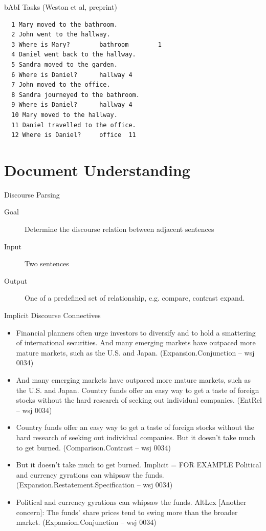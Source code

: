 \documentclass{beamer}
\begin{document}
\begin{frame}[fragile]{bAbI Tasks (Weston et al, preprint) }
\begin{verbatim}
  1 Mary moved to the bathroom.
  2 John went to the hallway.
  3 Where is Mary?        bathroom        1
  4 Daniel went back to the hallway.
  5 Sandra moved to the garden.
  6 Where is Daniel?      hallway 4
  7 John moved to the office.
  8 Sandra journeyed to the bathroom.
  9 Where is Daniel?      hallway 4
  10 Mary moved to the hallway.
  11 Daniel travelled to the office.
  12 Where is Daniel?     office  11
\end{verbatim}
\end{frame}

\section{Document Understanding}

\begin{frame}{Discourse Parsing}
  \begin{description}
  \item[Goal] Determine the discourse relation between adjacent sentences
  \item[Input] Two sentences 
  \item[Output] One of a predefined set of relationship, e.g. compare, contrast expand.
  \end{description}  

\end{frame}

\begin{frame}{Implicit Discourse Connectives}
  \begin{itemize}
  \item Financial planners often urge investors to diversify and to
    hold a smattering of international securities. And many emerging
    markets have outpaced more mature markets, such as the U.S. and
    Japan.  (Expansion.Conjunction – wsj 0034) 
  \item And many emerging
    markets have outpaced more mature markets, such as the U.S. and
    Japan. Country funds offer an easy way to get a taste of foreign
    stocks without the hard research of seeking out individual
    companies.  (EntRel – wsj 0034) 
  \item Country funds offer an easy
    way to get a taste of foreign stocks without the hard research of
    seeking out individual companies. But it doesn’t take much to get
    burned.  (Comparison.Contrast – wsj 0034) 
  \item But it doesn’t take
    much to get burned. Implicit = FOR EXAMPLE Political and currency
    gyrations can whipsaw the funds.
    (Expansion.Restatement.Specification – wsj 0034) 
  \item Political and
    currency gyrations can whipsaw the funds. AltLex [Another
    concern]: The funds’ share prices tend to swing more than the
    broader market.  (Expansion.Conjunction – wsj 0034)
  \end{itemize}
\end{frame}
\end{document}
